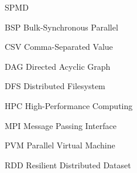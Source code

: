 \begin{listofabbrv}{SPMD}
	\item[BSP] Bulk-Synchronous Parallel
	\item[CSV] Comma-Separated Value
        \item[DAG] Directed Acyclic Graph
        \item[DFS] Distributed Filesystem
        \item[HPC] High-Performance Computing
        \item[MPI] Message Passing Interface
        \item[PVM] Parallel Virtual Machine
        \item[RDD] Resilient Distributed Dataset
\end{listofabbrv}


\listoffigures

\listoftables

\tableofcontents